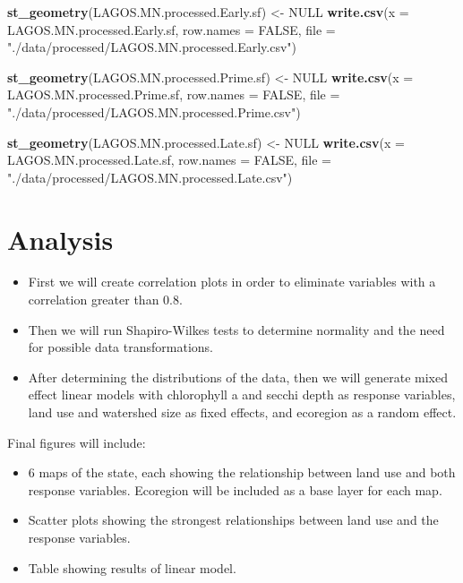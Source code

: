 \documentclass[12pt,]{article}
\newenvironment{Shaded}{\begin{snugshade}}{\end{snugshade}}
\newcommand{\DataTypeTok}[1]{\textcolor[rgb]{0.13,0.29,0.53}{#1}}
\newcommand{\KeywordTok}[1]{\textcolor[rgb]{0.13,0.29,0.53}{\textbf{#1}}}
\newcommand{\NormalTok}[1]{#1}
\newcommand{\OtherTok}[1]{\textcolor[rgb]{0.56,0.35,0.01}{#1}}
\newcommand{\StringTok}[1]{\textcolor[rgb]{0.31,0.60,0.02}{#1}}
\providecommand{\tightlist}{%
  \setlength{\itemsep}{0pt}\setlength{\parskip}{0pt}}
\begin{document}
\begin{Shaded}
\begin{Highlighting}[]
\KeywordTok{st_geometry}\NormalTok{(LAGOS.MN.processed.Early.sf) <-}\StringTok{ }\OtherTok{NULL}
\KeywordTok{write.csv}\NormalTok{(}\DataTypeTok{x =}\NormalTok{  LAGOS.MN.processed.Early.sf, }\DataTypeTok{row.names =} \OtherTok{FALSE}\NormalTok{,}
          \DataTypeTok{file =}  \StringTok{"./data/processed/LAGOS.MN.processed.Early.csv"}\NormalTok{)}

\KeywordTok{st_geometry}\NormalTok{(LAGOS.MN.processed.Prime.sf) <-}\StringTok{ }\OtherTok{NULL}
\KeywordTok{write.csv}\NormalTok{(}\DataTypeTok{x =}\NormalTok{  LAGOS.MN.processed.Prime.sf, }\DataTypeTok{row.names =} \OtherTok{FALSE}\NormalTok{,}
          \DataTypeTok{file =}  \StringTok{"./data/processed/LAGOS.MN.processed.Prime.csv"}\NormalTok{)}

\KeywordTok{st_geometry}\NormalTok{(LAGOS.MN.processed.Late.sf) <-}\StringTok{ }\OtherTok{NULL}
\KeywordTok{write.csv}\NormalTok{(}\DataTypeTok{x =}\NormalTok{  LAGOS.MN.processed.Late.sf, }\DataTypeTok{row.names =} \OtherTok{FALSE}\NormalTok{,}
          \DataTypeTok{file =}  \StringTok{"./data/processed/LAGOS.MN.processed.Late.csv"}\NormalTok{)}
\end{Highlighting}
\end{Shaded}

\newpage

\hypertarget{analysis}{%
\section{Analysis}\label{analysis}}

\begin{itemize}
\tightlist
\item
  First we will create correlation plots in order to eliminate variables
  with a correlation greater than 0.8.
\item
  Then we will run Shapiro-Wilkes tests to determine normality and the
  need for possible data transformations.
\item
  After determining the distributions of the data, then we will generate
  mixed effect linear models with chlorophyll a and secchi depth as
  response variables, land use and watershed size as fixed effects, and
  ecoregion as a random effect.
\end{itemize}

Final figures will include:

\begin{itemize}
\tightlist
\item
  6 maps of the state, each showing the relationship between land use
  and both response variables. Ecoregion will be included as a base
  layer for each map.
\item
  Scatter plots showing the strongest relationships between land use and
  the response variables.
\item
  Table showing results of linear model.
\end{itemize}
\end{document}
